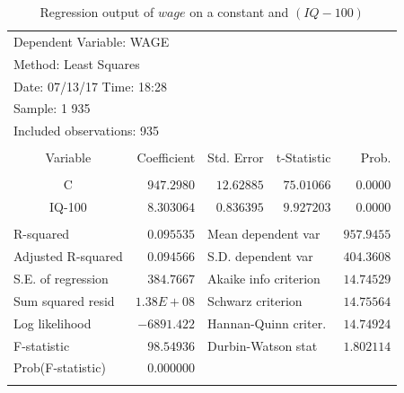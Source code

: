 \documentclass[12pt]{report}
\begin{document}
\begin{table}[!htbp]
	\centering
	\begin{tabular}{lrrrr}
		\multicolumn{3}{l}{Dependent Variable: WAGE}&\multicolumn{1}{c}{}&\multicolumn{1}{c}{}\\
		\multicolumn{3}{l}{Method: Least Squares}&\multicolumn{1}{c}{}&\multicolumn{1}{c}{}\\
		\multicolumn{3}{l}{Date: 07/13/17   Time: 18:28}&\multicolumn{1}{c}{}&\multicolumn{1}{c}{}\\
		\multicolumn{2}{l}{Sample: 1 935}&\multicolumn{1}{c}{}&\multicolumn{1}{c}{}&\multicolumn{1}{c}{}\\
		\multicolumn{3}{l}{Included observations: 935}&\multicolumn{1}{c}{}&\multicolumn{1}{c}{}\\
		[4.5pt] \hline \\ [-4.5pt]
		\multicolumn{1}{c}{Variable}&\multicolumn{1}{r}{Coefficient}&\multicolumn{1}{r}{Std. Error}&\multicolumn{1}{r}{t-Statistic}&\multicolumn{1}{r}{Prob.}\\
		[4.5pt] \hline \\ [-4.5pt]
		\multicolumn{1}{c}{C}&\multicolumn{1}{r}{$947.2980$}&\multicolumn{1}{r}{$12.62885$}&\multicolumn{1}{r}{$75.01066$}&\multicolumn{1}{r}{$0.0000$}\\
		\multicolumn{1}{c}{IQ-100}&\multicolumn{1}{r}{$8.303064$}&\multicolumn{1}{r}{$0.836395$}&\multicolumn{1}{r}{$9.927203$}&\multicolumn{1}{r}{$0.0000$}\\
		[4.5pt] \hline \\ [-4.5pt]
		\multicolumn{1}{l}{R-squared}&\multicolumn{1}{r}{$0.095535$}&\multicolumn{2}{l}{Mean dependent var}&\multicolumn{1}{r}{$957.9455$}\\
		\multicolumn{1}{l}{Adjusted R-squared}&\multicolumn{1}{r}{$0.094566$}&\multicolumn{2}{l}{S.D. dependent var}&\multicolumn{1}{r}{$404.3608$}\\
		\multicolumn{1}{l}{S.E. of regression}&\multicolumn{1}{r}{$384.7667$}&\multicolumn{2}{l}{Akaike info criterion}&\multicolumn{1}{r}{$14.74529$}\\
		\multicolumn{1}{l}{Sum squared resid}&\multicolumn{1}{r}{$1.38E+08$}&\multicolumn{2}{l}{Schwarz criterion}&\multicolumn{1}{r}{$14.75564$}\\
		\multicolumn{1}{l}{Log likelihood}&\multicolumn{1}{r}{$-6891.422$}&\multicolumn{2}{l}{Hannan-Quinn criter.}&\multicolumn{1}{r}{$14.74924$}\\
		\multicolumn{1}{l}{F-statistic}&\multicolumn{1}{r}{$98.54936$}&\multicolumn{2}{l}{Durbin-Watson stat}&\multicolumn{1}{r}{$1.802114$}\\
		\multicolumn{1}{l}{Prob(F-statistic)}&\multicolumn{1}{r}{$0.000000$}&\multicolumn{1}{c}{}&\multicolumn{1}{c}{}&\multicolumn{1}{c}{}\\
		[4.5pt] \hline \\ [-4.5pt]
	\end{tabular}
	\caption{Regression output of $wage$ on a constant and $(IQ-100)$}
	\label{tbl:regout2}
\end{table}
\end{document}
